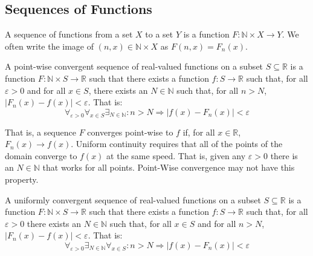 \documentclass[crop=false,class=book,oneside]{standalone}
\begin{document}
        \subsection{Sequences of Functions}
            \begin{definition}
                A sequence of functions from a
                set $X$ to a set $Y$ is a function
                $F:\mathbb{N}\times{X}\rightarrow{Y}$.
                We often write the image of
                $(n,x)\in\mathbb{N}\times{X}$ as
                $F(n,x)=F_{n}(x)$.
            \end{definition}
            \begin{definition}
                A point-wise convergent
                sequence of real-valued functions on
                a subset $S\subseteq\mathbb{R}$
                is a function
                $F:\mathbb{N}\times{S}\rightarrow\mathbb{R}$
                such that there exists a function
                $f:S\rightarrow\mathbb{R}$ such that,
                for all $\varepsilon>0$ and for all
                $x\in{S}$, there exists an
                $N\in\mathbb{N}$ such that, for all
                $n>N$, $|F_{n}(x)-f(x)|<\varepsilon$.
                That is:
                \begin{equation}
                    \label{eqn:FUNCTIONAL_ANALYSIS:POINTWISE_CONV_DEF}
                    \forall_{\varepsilon>0}
                    \forall_{x\in{S}}
                    \exists_{N\in\mathbb{N}}:
                    n>N\Rightarrow
                    |f(x)-F_{n}(x)|<\varepsilon
                \end{equation}
            \end{definition}
            That is, a sequence $F$ converges point-wise
            to $f$ if, for all $x\in\mathbb{R}$,
            $F_{n}(x)\rightarrow{f(x)}$.
            Uniform continuity requires that all of the
            points of the domain converge to $f(x)$ at
            the same speed. That is, given any $\varepsilon>0$
            there is an $N\in\mathbb{N}$ that works for
            all points. Point-Wise convergence may not
            have this property.
            \begin{definition}
                A uniformly convergent
                sequence of real-valued functions on
                a subset $S\subseteq\mathbb{R}$
                is a function
                $F:\mathbb{N}\times{S}\rightarrow\mathbb{R}$
                such that there exists a function
                $f:S\rightarrow\mathbb{R}$ such that,
                for all $\varepsilon>0$ there exists
                an $N\in\mathbb{N}$ such that, for all
                $x\in{S}$ and for all
                $n>N$, $|F_{n}(x)-f(x)|<\varepsilon$.
                That is:
                \begin{equation}
                    \label{eqn:FUNCTIONAL_ANALYSIS:UNIFORM_CONV_DEF}
                    \forall_{\varepsilon>0}
                    \exists_{N\in\mathbb{N}}
                    \forall_{x\in{S}}:
                    n>N\Rightarrow
                    |f(x)-F_{n}(x)|<\varepsilon
                \end{equation}
            \end{definition}
\end{document}
